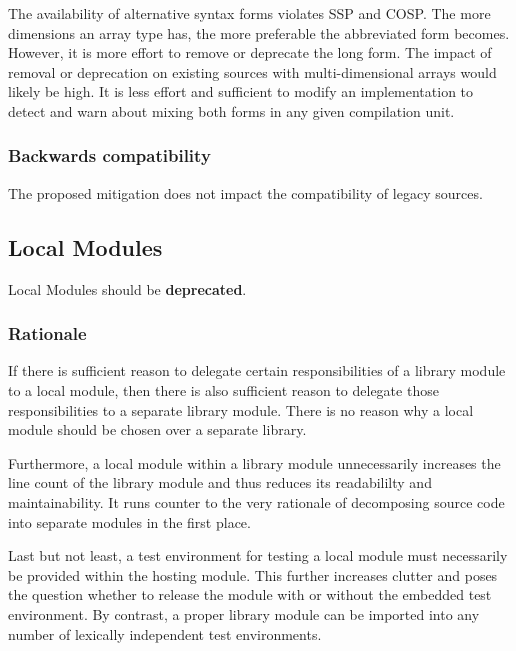 \documentclass[10pt,a4paper]{article}
\begin{document}
\par\noindent The availability of alternative syntax forms violates SSP and
COSP. The more dimensions an array type has, the more preferable the
abbreviated form becomes. However, it is more effort to remove or deprecate
the long form. The impact of removal or deprecation on existing sources with
multi-dimensional arrays would likely be high. It is less effort and sufficient
to modify an implementation to detect and warn about mixing both forms in any
given compilation unit.

\subsubsection{Backwards compatibility}

The proposed mitigation does not impact the compatibility of legacy sources.


\subsection{Local Modules}

Local Modules should be \textbf{deprecated}.

\subsubsection{Rationale}
If there is sufficient reason to delegate certain responsibilities of a library
module to a local module, then there is also sufficient reason to delegate those
responsibilities to a separate library module. There is no reason why a local
module should be chosen over a separate library.

Furthermore, a local module within a library module unnecessarily increases the
line count of the library module and thus reduces its readabililty and
maintainability. It runs counter to the very rationale of decomposing source
code into separate modules in the first place.

Last but not least, a test environment for testing a local module must
necessarily be provided within the hosting module.  This further increases
clutter and poses the question whether to release the module with or without
the embedded test environment. By contrast, a proper library module can be
imported into any number of lexically independent test environments.
\end{document}
